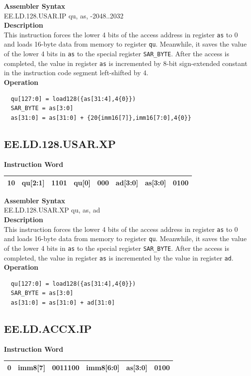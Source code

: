 \textbf{Assembler Syntax} \\
EE.LD.128.USAR.IP qu, as, -2048..2032 \\
\textbf{Description} \\
This instruction forces the lower 4 bits of the access address in register \lstinline{as} to 0 and loads 16-byte data from memory to register \lstinline{qu}. Meanwhile, it saves the value of the lower 4 bits in \lstinline{as} to the special register \lstinline{SAR_BYTE}. After the access is completed, the value in register \lstinline{as} is incremented by 8-bit sign-extended constant in the instruction code segment left-shifted by 4.\\
\textbf{Operation}
\begin{lstlisting}
  qu[127:0] = load128({as[31:4],4{0}})
  SAR_BYTE = as[3:0]
  as[31:0] = as[31:0] + {20{imm16[7]},imm16[7:0],4{0}}
\end{lstlisting}

\clearpage
\subsection{EE.LD.128.USAR.XP}\label{instruction:EELD128USARXP}
\setlength\tabcolsep{6pt}
\textbf{Instruction Word} \\
\begin{tabular}{|c|c|c|c|c|c|c|c|}
	\hline
	10 & qu[2:1] & 1101 & qu[0] & 000 & ad[3:0] & as[3:0] & 0100 \\
	\hline
\end{tabular}

\textbf{Assembler Syntax} \\
EE.LD.128.USAR.XP qu, as, ad \\
\textbf{Description} \\
This instruction forces the lower 4 bits of the access address in register \lstinline{as} to 0 and loads 16-byte data from memory to register \lstinline{qu}. Meanwhile, it saves the value of the lower 4 bits in \lstinline{as} to the special register \lstinline{SAR_BYTE}. After the access is completed, the value in register \lstinline{as} is incremented by the value in register \lstinline{ad}.\\
\textbf{Operation}
\begin{lstlisting}
  qu[127:0] = load128({as[31:4],4{0}})
  SAR_BYTE = as[3:0]
  as[31:0] = as[31:0] + ad[31:0]
\end{lstlisting}

\clearpage
\subsection{EE.LD.ACCX.IP}\label{instruction:EELDACCXIP}
\setlength\tabcolsep{6pt}
\textbf{Instruction Word} \\
\begin{tabular}{|c|c|c|c|c|c|}
	\hline
	0 & imm8[7] & 0011100 & imm8[6:0] & as[3:0] & 0100 \\
	\hline
\end{tabular}

